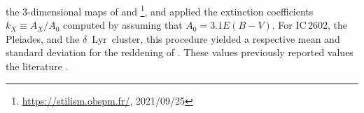 \documentclass[12pt,modern,twocolumn,tighten]{aastex63}
\newcommand{\cn}{$\delta$\ Lyr\ cluster} %
\begin{document}
 the
3-dimensional maps of \citet{capitanio_threedimensional_2017} and
\citet{lallement_threedimensional_2018}\footnote{\url{https://stilism.obspm.fr/},
2021/09/25}, and applied the extinction coefficients $k_X\equiv
A_X/A_0$ computed by \citet{GaiaCollaboration2018} assuming that $A_0
= 3.1 E(B-V)$.  For IC\,2602, the Pleiades, and the \cn, this
procedure yielded a respective mean and standard deviation for the
reddening of .
These values  previously reported values
 the literature \citep{pecaut_star_2016,GaiaCollaboration2018,KounkelCovey2019,bossini_age_2019}.

%
%
%
\end{document}
